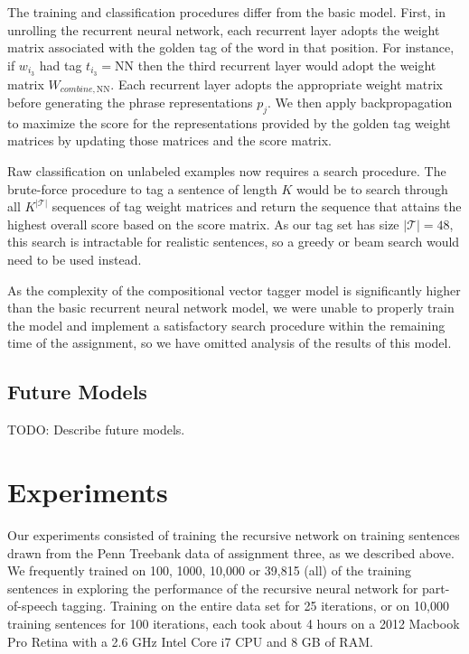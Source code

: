 \documentclass[11pt]{article}
\begin{document}
\vspace{5mm}
The training and classification procedures differ from the basic model. First, in unrolling the recurrent neural network, each recurrent layer adopts the weight matrix associated with the golden tag of the word in that position. For instance, if $w_{i_3}$ had tag $t_{i_3} = \text{NN}$ then the third recurrent layer would adopt the weight matrix $W_{combine,\text{NN}}$. Each recurrent layer adopts the appropriate weight matrix before generating the phrase representations $p_j$. We then apply backpropagation to maximize the score for the representations provided by the golden tag weight matrices by updating those matrices and the score matrix.

Raw classification on unlabeled examples now requires a search procedure. The brute-force procedure to tag a sentence of length $K$ would be to search through all $K^{\left\vert\mathcal{T}\right\vert}$ sequences of tag weight matrices and return the sequence that attains the highest overall score based on the score matrix. As our tag set has size $\left\vert\mathcal{T}\right\vert=48$, this search is intractable for realistic sentences, so a greedy or beam search would need to be used instead.

As the complexity of the compositional vector tagger model is significantly higher than the basic recurrent neural network model, we were unable to properly train the model and implement a satisfactory search procedure within the remaining time of the assignment, so we have omitted analysis of the results of this model.

\subsection{Future Models}

TODO: Describe future models.

\section{Experiments}

Our experiments consisted of training the recursive network on training sentences drawn from the Penn Treebank data of assignment three, as we described above. We frequently trained on 100, 1000, 10,000 or 39,815 (all) of the training sentences in exploring the performance of the recursive neural network for part-of-speech tagging. Training on the entire data set for 25 iterations, or on 10,000 training sentences for 100 iterations, each took about 4 hours on a 2012 Macbook Pro Retina with a 2.6 GHz Intel Core i7 CPU and 8 GB of RAM.
\end{document}
